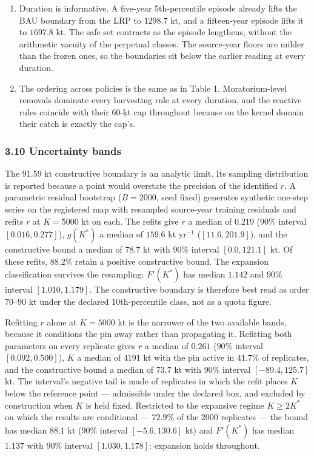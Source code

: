 \begin{enumerate}
\def\labelenumi{(\roman{enumi})}
\item
  Duration is informative. A five-year 5th-percentile episode already
  lifts the BAU boundary from the LRP to \(1298.7\) kt, and a
  fifteen-year episode lifts it to \(1697.8\) kt. The safe set contracts
  as the episode lengthens, without the arithmetic vacuity of the
  perpetual classes. The source-year floors are milder than the frozen
  ones, so the boundaries sit below the earlier reading at every
  duration.
\item
  The ordering across policies is the same as in Table 1.
  Moratorium-level removals dominate every harvesting rule at every
  duration, and the reactive rules coincide with their 60-kt cap
  throughout because on the kernel domain their catch is exactly the
  cap's.
\end{enumerate}

\subsubsection{3.10 Uncertainty bands}\label{budget-uncertainty-bands}

The \(91.59\) kt constructive boundary is an analytic limit. Its sampling
distribution is reported because a point would overstate the precision
of the identified \(r\). A parametric residual bootstrap (\(B = 2000\),
seed fixed) generates synthetic one-step series on the registered map
with resampled source-year training residuals and refits \(r\) at
\(K = 5000\) kt on each. The refits give \(r\) a median of \(0.219\)
(\(90\%\) interval \([0.016, 0.277]\)), \(g(K^*)\) a median of \(159.6\)
kt yr\(^{-1}\) (\([11.6, 201.9]\)), and the constructive bound a median
of \(78.7\) kt with \(90\%\) interval \([0.0, 121.1]\) kt. Of these
refits, \(88.2\%\) retain a positive constructive bound. The expansion
classification survives the resampling: \(F'(K^*)\) has median \(1.142\)
and \(90\%\) interval \([1.010, 1.179]\). The constructive boundary is
therefore best read as order \(70\)--\(90\) kt under the declared
10th-percentile class, not as a quota figure.

Refitting \(r\) alone at \(K = 5000\) kt is the narrower of the two
available bands, because it conditions the pin away rather than propagating
it. Refitting both parameters on every replicate gives \(r\) a median of
\(0.261\) (\(90\%\) interval \([0.092, 0.500]\)), \(K\) a median of
\(4191\) kt with the pin active in \(41.7\%\) of replicates, and the
constructive bound a median of \(73.7\) kt with \(90\%\) interval
\([-89.4, 125.7]\) kt. The interval's negative tail is made of replicates in
which the refit places \(K\) below the reference point --- admissible under
the declared box, and excluded by construction when \(K\) is held fixed.
Restricted to the expansive regime \(K \ge 2K^*\) on which the results are
conditional --- \(72.9\%\) of the \(2000\) replicates --- the bound has
median \(88.1\) kt (\(90\%\) interval
\([-5.6, 130.6]\) kt) and \(F'(K^*)\) has median \(1.137\) with
\(90\%\) interval \([1.030, 1.178]\): expansion holds throughout.

